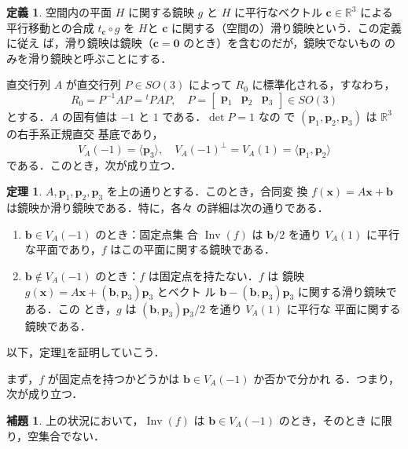 \documentclass[11pt, uplatex, dvipdfmx, titlepage]{jsarticle}
\DeclareMathOperator{\Inv}{Inv}
\theoremstyle{definition}
\newtheorem{theorem}{定理}[section]
\newtheorem*{definition}{定義}
\newtheorem{lemma}{補題}[section]
\begin{document}
\begin{definition}
  空間内の平面 $H$ に関する鏡映 $g$ と $H$ に平行なベクトル $\bm{c}
  \in \mathbb{R}^3$ による平行移動との合成 $t_{\bm{c}} \circ
  g$ を $H$と $\bm{c}$ に関する（空間の）滑り鏡映という．この定義に従え
  ば，滑り鏡映は鏡映（$\bm{c}=\bm{0}$ のとき）を含むのだが，鏡映でないもの
  のみを滑り鏡映と呼ぶことにする．
\end{definition}


直交行列 $A$ が直交行列 $P \in SO(3)$ によって $R_{0}$ に標準化される，すなわち，
\[
  R_{0} = P^{-1}AP = {}^{t}PAP, \quad P=\left[
    \begin{array}{ccc}
      \bm{p}_1 & \bm{p}_2 & \bm{p}_3
    \end{array}
  \right] \in SO(3)
\]
とする．$A$ の固有値は $-1$ と $1$ である．$\det P=1$ なの
で $(\bm{p}_1, \bm{p}_2, \bm{p}_3)$ は $\mathbb{R}^3$ の右手系正規直交
基底であり，
\[
  V_A(-1) = \langle \bm{p}_3\rangle, \quad V_A(-1)^{\perp} = V_A(1)
  =\langle \bm{p}_1, \bm{p}_2 \rangle
\]
である．このとき，次が成り立つ．

\begin{theorem}\label{thm:RefOrGlide3}
  $A, \bm{p}_1, \bm{p}_2, \bm{p}_3$ を上の通りとする．このとき，合同変
  換 $f(\bm{x}) = A\bm{x} + \bm{b}$ は鏡映か滑り鏡映である．特に，各々
  の詳細は次の通りである．
  \begin{enumerate}[(1)]
  \item $\bm{b} \in V_A(-1)$ のとき：固定点集
    合 $\Inv(f)$ は $\bm{b}/2$ を通り $V_A(1)$ に平行な平面であり，$f$
    はこの平面に関する鏡映である．

  \item $\bm{b} \not\in V_A(-1)$ のとき：$f$ は固定点を持たない．$f$ は
    鏡映 $g(\bm{x})=A\bm{x} + (\bm{b},\bm{p}_3)\bm{p}_3$ とベクト
    ル $\bm{b}-(\bm{b},\bm{p}_3)\bm{p}_3$ に関する滑り鏡映である．この
    とき，$g$ は $(\bm{b},\bm{p}_3)\bm{p}_3/2$ を通り $V_A(1)$ に平行な
    平面に関する鏡映である．
  \end{enumerate}
\end{theorem}

以下，定理\ref{thm:RefOrGlide3}を証明していこう．

まず，$f$ が固定点を持つかどうかは $\bm{b} \in V_A(-1)$ か否かで分かれ
る．つまり，次が成り立つ．

\begin{lemma}\label{lem:RefOrGlide3}
  上の状況において，$\Inv(f)$ は $\bm{b} \in V_A(-1)$ のとき，そのとき
  に限り，空集合でない．
\end{lemma}
\end{document}
